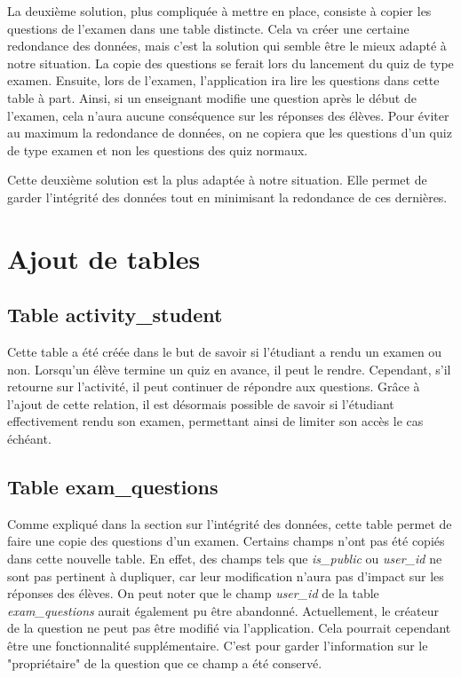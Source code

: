 La deuxième solution, plus compliquée à mettre en place, consiste à copier les questions de l'examen dans une table distincte. Cela va créer une certaine redondance des données, mais c'est la solution qui semble être le mieux adapté à notre situation. La copie des questions se ferait lors du lancement du quiz de type examen. Ensuite, lors de l'examen, l'application ira lire les questions dans cette table à part. Ainsi, si un enseignant modifie une question après le début de l'examen, cela n'aura aucune conséquence sur les réponses des élèves. Pour éviter au maximum la redondance de données, on ne copiera que les questions d'un quiz de type examen et non les questions des quiz normaux.

Cette deuxième solution est la plus adaptée à notre situation. Elle permet de garder l'intégrité des données tout en minimisant la redondance de ces dernières.

\section{Ajout de tables}

\subsection{Table activity\_student}
Cette table a été créée dans le but de savoir si l'étudiant a rendu un examen ou non. Lorsqu'un élève termine un quiz en avance, il peut le rendre. Cependant, s'il retourne sur l'activité, il peut continuer de répondre aux questions. Grâce à l'ajout de cette relation, il est désormais possible de savoir si l'étudiant effectivement rendu son examen, permettant ainsi de limiter son accès le cas échéant.

\subsection{Table exam\_questions}
Comme expliqué dans la section sur l'intégrité des données, cette table permet de faire une copie des questions d'un examen. Certains champs n'ont pas été copiés dans cette nouvelle table. En effet, des champs tels que \emph{is\_public} ou \emph{user\_id} ne sont pas pertinent à dupliquer, car leur modification n'aura pas d'impact sur les réponses des élèves. On peut noter que le champ \emph{user\_id} de la table \emph{exam\_questions} aurait également pu être abandonné. Actuellement, le créateur de la question ne peut pas être modifié via l'application. Cela pourrait cependant être une fonctionnalité supplémentaire. C'est pour garder l'information sur le "propriétaire" de la question que ce champ a été conservé.

